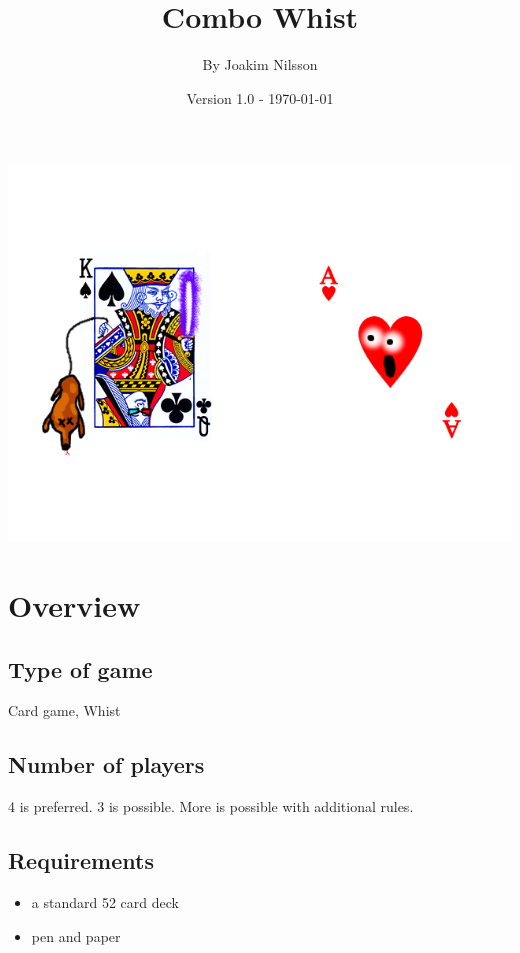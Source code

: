\documentclass[a4paper]{article}
\title{Combo Whist}
\author{By Joakim Nilsson}
\date{Version 1.0 - \today}
\begin{document}
	\maketitle
	
	\begin{center}
		\includegraphics[width = \textwidth]{logo.png}
	\end{center}
	
	\thispagestyle{empty}
	\pagebreak
	
	\setcounter{tocdepth}{3}
	\tableofcontents
	\thispagestyle{empty}
	\pagebreak
	
	\section{Overview}
		\subsection{Type of game}
		Card game, Whist
		
		\subsection{Number of players}
		4 is preferred. 3 is possible. More is possible with additional rules.
		
		\subsection{Requirements}
		\begin{itemize}
			\item a standard 52 card deck
			\item pen and paper
		\end{itemize}
		
\end{document}
